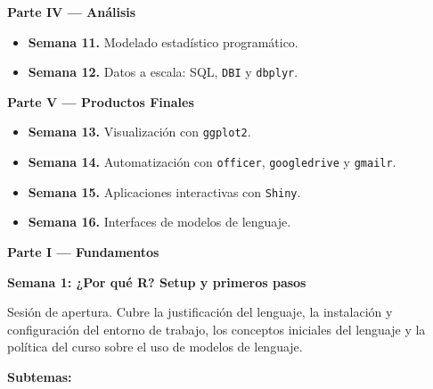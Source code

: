 \documentclass[11pt,letterpaper]{article}
\newcommand{\parteCurso}[1]{%
  \clearpage%
  \vspace*{0.5cm}%
  {\centering\color{main}\fontsize{26pt}{32pt}\selectfont\bfseries #1\par}%
  \vspace{0.8cm}%
}
\newcommand{\semana}[2]{%
  \bigskip%
  {\color{main}\Large\bfseries Semana #1: #2\par}%
  \smallskip%
}
\begin{document}
\smallskip
\noindent\textbf{\textcolor{main}{Parte IV --- Análisis}}
\begin{itemize}[leftmargin=*, itemsep=1pt]
    \item \textbf{Semana 11.} Modelado estadístico programático.
    \item \textbf{Semana 12.} Datos a escala: SQL, \texttt{DBI} y \texttt{dbplyr}.
\end{itemize}

\smallskip
\noindent\textbf{\textcolor{main}{Parte V --- Productos Finales}}
\begin{itemize}[leftmargin=*, itemsep=1pt]
    \item \textbf{Semana 13.} Visualización con \texttt{ggplot2}.
    \item \textbf{Semana 14.} Automatización con \texttt{officer}, \texttt{googledrive} y \texttt{gmailr}.
    \item \textbf{Semana 15.} Aplicaciones interactivas con \texttt{Shiny}.
    \item \textbf{Semana 16.} Interfaces de modelos de lenguaje.
\end{itemize}

\parteCurso{Parte I --- Fundamentos}

\semana{1}{¿Por qué R? Setup y primeros pasos}

Sesión de apertura. Cubre la justificación del lenguaje, la instalación y configuración del entorno de trabajo, los conceptos iniciales del lenguaje y la política del curso sobre el uso de modelos de lenguaje.

\textbf{Subtemas:}
\end{document}
